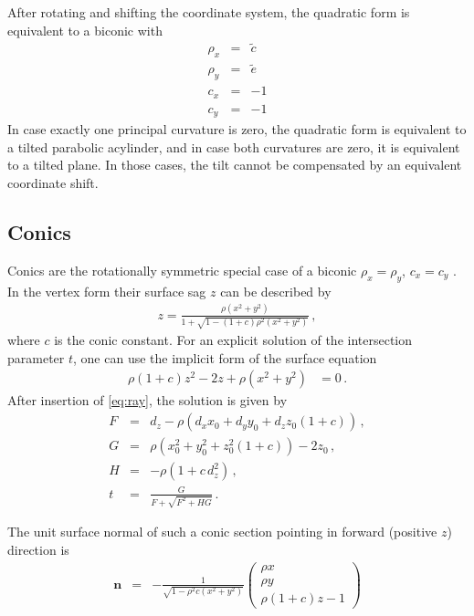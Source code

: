 \documentclass[12pt,a4paper,twoside,openright,BCOR10mm,headsepline,titlepage,abstracton,chapterprefix,final]{scrreprt}
\newcommand\Vector[1]{{\mathbf{#1}}}
\begin{document}
After rotating and shifting the coordinate system, the quadratic form is equivalent to a biconic with
\begin{eqnarray}
 \rho_x &=& \tilde{c} \\
 \rho_y &=& \tilde{e} \\
 c_x &=& -1 \\
 c_y &=& -1
\end{eqnarray}
In case exactly one principal curvature is zero, the quadratic form is equivalent to a tilted parabolic acylinder, and in case both curvatures are zero, it is equivalent to a tilted plane.
In those cases, the tilt cannot be compensated by an equivalent coordinate shift.


\subsection{Conics}
Conics are the rotationally symmetric special case of a biconic $\rho_x = \rho_y$, $c_x = c_y$ .
In the vertex form their surface sag $z$ can be described by
\begin{eqnarray}
 z =  \frac
 { \rho ( x^2 + y^2 ) }
 { 1 + \sqrt{1 - (1+c) \rho^2  (x^2 + y^2)} }\,,
\end{eqnarray}
where $c$ is the conic constant. 
For an explicit solution of the intersection parameter $t$,
one can use the implicit form of the surface equation
\begin{align}
 \rho (1 + c) z^2 - 2 z + \rho (x^2 + y^2) &=0\,.
\end{align}
After insertion of \eqref{eq:ray}, the solution is given by
\begin{subequations}
\label{eq:intersectionconicsection}
\begin{eqnarray}
   F &=& d_z - \rho \left( d_x x_0 + d_y y_0 + d_z z_0 (1+c) \right)\,, \\
   G &=& \rho (x_0^2 + y_0^2 + z_0^2 (1+c)) - 2 z_0\,, \\
   H &=& - \rho ( 1 + c \, d_z^2 )\,, \\
   t &=& \frac{G}{ F + \sqrt{F^2 + H G} }\,.
\end{eqnarray}
\end{subequations}

The unit surface normal of such a conic section pointing in forward (positive $z$) direction is
\begin{eqnarray}
\Vector{n} &=& - \frac{1}{\sqrt{ 1 - \rho^2 c (x^2 + y^2)}} 
  \begin{pmatrix}
   \rho x \\
   \rho y \\
   \rho ( 1 + c ) z - 1
  \end{pmatrix}
\end{eqnarray}
\end{document}
